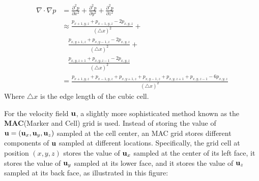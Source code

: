 \begin{equation}
    \begin{aligned}
        \nabla \cdot \nabla p 
        &= 
        \frac{\partial ^2 p}{\partial x^2}+
        \frac{\partial ^2 p}{\partial y^2}+
        \frac{\partial ^2 p}{\partial z^2} \\
        &\approx 
        \frac{p_{x+1,y,z}+p_{x-1,y,z}-2p_{x,y,z}}{(\triangle x)^2}+ \\
        &~~~~\frac{p_{x,y+1,z}+p_{x,y-1,z}-2p_{x,y,z}}{(\triangle x)^2}+ \\
        &~~~~\frac{p_{x,y,z+1}+p_{x,y,z-1}-2p_{x,y,z}}{(\triangle x)^2}\\
        &= \frac{p_{x+1,y,z}+p_{x-1,y,z}+p_{x,y+1,z}+p_{x,y-1,z}+p_{x,y,z+1}+p_{x,y,z-1}-6p_{x,y,z}}{(\triangle x)^2}
    \end{aligned}
    \label{eqn discrete laplacian pressure}
\end{equation}
Where $\triangle x$ is the edge length of the cubic cell. 


For the velocity field $\textbf{u}$, a slightly more sophisticated method known as the \textbf{MAC}(Marker and Cell) grid is used. Instead of storing the value of $\textbf{u} = (\textbf{u}_x,\textbf{u}_y,\textbf{u}_z)$ sampled at the cell center, an MAC grid stores different components of $\textbf{u}$ sampled at different locations. Specifically, the grid cell at position $(x,y,z)$ stores the value of $\textbf{u}_x$ sampled at the center of its left face, it stores the value of $\textbf{u}_y$ sampled at its lower face, and it stores the value of $\textbf{u}_z$ sampled at its back face, as illustrated in this figure:

